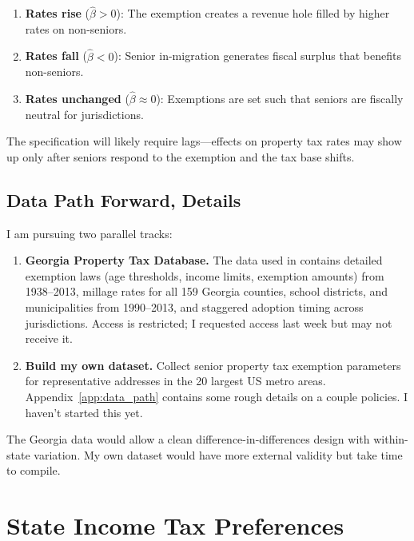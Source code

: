 \documentclass[11pt]{article}
\begin{document}
\begin{enumerate}
    \item \textbf{Rates rise} ($\hat{\beta} > 0$): The exemption creates a revenue hole filled by higher rates on non-seniors.
    \item \textbf{Rates fall} ($\hat{\beta} < 0$): Senior in-migration generates fiscal surplus that benefits non-seniors.
    \item \textbf{Rates unchanged} ($\hat{\beta} \approx 0$): Exemptions are set such that seniors are fiscally neutral for jurisdictions.
\end{enumerate}

The specification will likely require lags—effects on property tax rates may show up only after seniors respond to the exemption and the tax base shifts.

\subsection{Data Path Forward, Details}

I am pursuing two parallel tracks:

\begin{enumerate}
    \item \textbf{Georgia Property Tax Database.} The data used in \citet{banzhaf2021age} contains detailed exemption laws (age thresholds, income limits, exemption amounts) from 1938--2013, millage rates for all 159 Georgia counties, school districts, and municipalities from 1990--2013, and staggered adoption timing across jurisdictions. Access is restricted; I requested access last week but may not receive it.

    \item \textbf{Build my own dataset.} Collect senior property tax exemption parameters for representative addresses in the 20 largest US metro areas. Appendix~\ref{app:data_path} contains some rough details on a couple policies. I haven't started this yet. 
\end{enumerate}

\noindent The Georgia data would allow a clean difference-in-differences design with within-state variation. My own dataset would have more external validity but take time to compile.



\appendix

\section{State Income Tax Preferences}
\label{app:state_income_tax}
\end{document}

